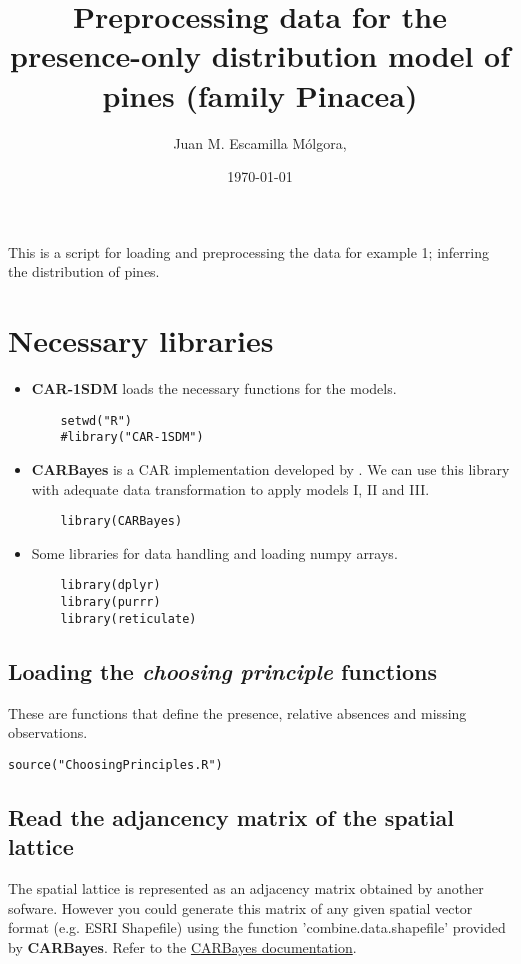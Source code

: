\documentclass[11pt]{article}
\author{Juan M. Escamilla Mólgora,}
\date{\today}
\title{Preprocessing data for the presence-only distribution model of pines (family Pinacea)}
\begin{document}
\maketitle
This is a script for loading and preprocessing the data for example 1; inferring the distribution of pines.

\section{Necessary libraries}
\label{sec:org7c0a3d4}
\begin{itemize}
\item \textbf{CAR-1SDM} loads the necessary functions for the models.
\begin{verbatim}
    setwd("R")
    #library("CAR-1SDM")
\end{verbatim}

\item \textbf{CARBayes} is a CAR implementation developed by \cite{Lee2013}. We can use this library with adequate data transformation to apply models I, II and III.
\begin{verbatim}
    library(CARBayes)
\end{verbatim}

\item Some libraries for data handling and loading numpy arrays.
\begin{verbatim}
    library(dplyr)
    library(purrr)
    library(reticulate)
\end{verbatim}
\end{itemize}


\subsection{Loading the \emph{choosing principle} functions}
\label{sec:orgd43e537}
These are functions that define the presence, relative absences and missing observations.
\begin{verbatim}
source("ChoosingPrinciples.R")
\end{verbatim}


\subsection{Read the adjancency matrix of the spatial lattice}
\label{sec:org3e73cc9}
The spatial lattice is represented as an adjacency matrix obtained by another sofware. However you could generate this matrix of any given spatial vector format (e.g. ESRI Shapefile) using the function 'combine.data.shapefile' provided by \textbf{CARBayes}. Refer to the \href{https://cran.r-project.org/web/packages/CARBayes/CARBayes.pdf}{CARBayes documentation}.
\end{document}
